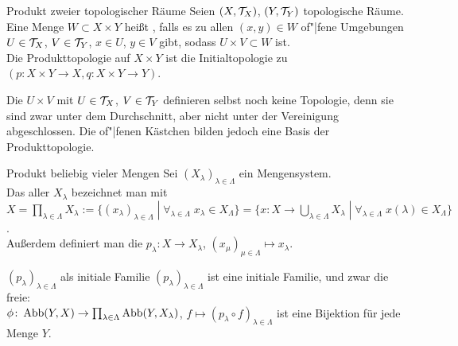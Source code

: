 \begin{Def}{Produkt zweier topologischer Räume}
    Seien $(X, \mathcal{T}_X)$, $(Y, \mathcal{T}_Y)$ topologische Räume.
    Eine Menge $W \subset X \times Y$ heißt
    , falls es zu allen $(x, y) \in W$
    of"|fene Umgebungen $U \in \mathcal{T}_X$, $V \in \mathcal{T}_Y$, $x \in U$, $y \in V$ gibt,
    sodass $U \times V \subset W$ ist. \\
    Die Produkttopologie auf $X \times Y$ ist die Initialtopologie zu
    $(p\colon X \times Y \rightarrow X, q\colon X \times Y \rightarrow Y)$.
\end{Def}

\begin{Bem}
    Die  $U \times V$ mit
    $U \in \mathcal{T}_X$, $V \in \mathcal{T}_Y$ definieren selbst noch keine Topologie, denn
    sie sind zwar unter dem Durchschnitt, aber nicht unter der Vereinigung
    abgeschlossen.
    Die of"|fenen Kästchen bilden jedoch eine Basis der Produkttopologie.
\end{Bem}

\linie

\begin{Def}{Produkt beliebig vieler Mengen}
    Sei $(X_\lambda)_{\lambda \in \Lambda}$ ein Mengensystem. \\
    Das  aller $X_\lambda$ bezeichnet man mit \\
    $X = \prod_{\lambda \in \Lambda} X_\lambda :=
    \{(x_\lambda)_{\lambda \in \Lambda} \;|\;
    \forall_{\lambda \in \Lambda}\; x_\lambda \in X_\Lambda\} =
    \{x\colon X \rightarrow \bigcup_{\lambda \in \Lambda} X_\lambda \;|\;
    \forall_{\lambda \in \Lambda}\; x(\lambda) \in X_\Lambda\}$. \\
    Außerdem definiert man die 
    $p_\lambda\colon X \rightarrow X_\lambda$,
    $(x_\mu)_{\mu \in \Lambda} \mapsto x_\lambda$.
\end{Def}

\begin{Satz}{$(p_\lambda)_{\lambda \in \Lambda}$ als initiale Familie}
    $(p_\lambda)_{\lambda \in \Lambda}$ ist eine initiale Familie,
    und zwar die freie: \\
    $\phi\colon \operatorname{Abb}(Y, X) \rightarrow
    \prod_{\lambda \in \Lambda} \operatorname{Abb}(Y, X_\lambda)$,
    $f \mapsto (p_\lambda \circ f)_{\lambda \in \Lambda}$ ist eine Bijektion
    für jede Menge $Y$.
\end{Satz}

\linie

